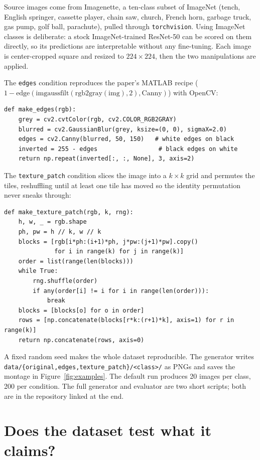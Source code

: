\documentclass[11pt]{article}
\begin{document}
Source images come from Imagenette, a ten-class subset of ImageNet (tench,
English springer, cassette player, chain saw, church, French horn, garbage truck,
gas pump, golf ball, parachute), pulled through \texttt{torchvision}. Using
ImageNet classes is deliberate: a stock ImageNet-trained ResNet-50 can be scored
on them directly, so its predictions are interpretable without any fine-tuning.
Each image is center-cropped square and resized to $224\times224$, then the two
manipulations are applied.

The \texttt{edges} condition reproduces the paper's MATLAB recipe
($1 - \text{edge}(\text{imgaussfilt}(\text{rgb2gray}(\text{img}), 2), \text{Canny})$)
with OpenCV:

\begin{lstlisting}
def make_edges(rgb):
    grey = cv2.cvtColor(rgb, cv2.COLOR_RGB2GRAY)
    blurred = cv2.GaussianBlur(grey, ksize=(0, 0), sigmaX=2.0)
    edges = cv2.Canny(blurred, 50, 150)   # white edges on black
    inverted = 255 - edges                 # black edges on white
    return np.repeat(inverted[:, :, None], 3, axis=2)
\end{lstlisting}

The \texttt{texture\_patch} condition slices the image into a $k\times k$ grid and
permutes the tiles, reshuffling until at least one tile has moved so the identity
permutation never sneaks through:

\begin{lstlisting}
def make_texture_patch(rgb, k, rng):
    h, w, _ = rgb.shape
    ph, pw = h // k, w // k
    blocks = [rgb[i*ph:(i+1)*ph, j*pw:(j+1)*pw].copy()
              for i in range(k) for j in range(k)]
    order = list(range(len(blocks)))
    while True:
        rng.shuffle(order)
        if any(order[i] != i for i in range(len(order))):
            break
    blocks = [blocks[o] for o in order]
    rows = [np.concatenate(blocks[r*k:(r+1)*k], axis=1) for r in range(k)]
    return np.concatenate(rows, axis=0)
\end{lstlisting}

A fixed random seed makes the whole dataset reproducible. The generator writes
\texttt{data/\{original,edges,texture\_patch\}/<class>/} as PNGs and saves the
montage in Figure~\ref{fig:examples}. The default run produces 20 images per
class, 200 per condition. The full generator and evaluator are two short scripts;
both are in the repository linked at the end.

\section{Does the dataset test what it claims?}
\end{document}
